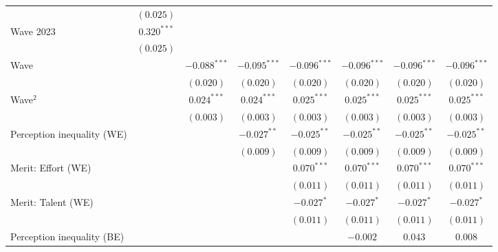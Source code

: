 \documentclass[
  12pt,
]{article}
\begin{document}
\begin{table}
{\begin{center}
{\begin{tabular}{l c c c c c c c}
                                   & $(0.025)$      &                &                &                &                &                &                \\
\quad Wave 2023                    & $0.320^{***}$  &                &                &                &                &                &                \\
                                   & $(0.025)$      &                &                &                &                &                &                \\
Wave                               &                & $-0.088^{***}$ & $-0.095^{***}$ & $-0.096^{***}$ & $-0.096^{***}$ & $-0.096^{***}$ & $-0.096^{***}$ \\
                                   &                & $(0.020)$      & $(0.020)$      & $(0.020)$      & $(0.020)$      & $(0.020)$      & $(0.020)$      \\
Wave$^2$                           &                & $0.024^{***}$  & $0.024^{***}$  & $0.025^{***}$  & $0.025^{***}$  & $0.025^{***}$  & $0.025^{***}$  \\
                                   &                & $(0.003)$      & $(0.003)$      & $(0.003)$      & $(0.003)$      & $(0.003)$      & $(0.003)$      \\
Perception inequality (WE)         &                &                & $-0.027^{**}$  & $-0.025^{**}$  & $-0.025^{**}$  & $-0.025^{**}$  & $-0.025^{**}$  \\
                                   &                &                & $(0.009)$      & $(0.009)$      & $(0.009)$      & $(0.009)$      & $(0.009)$      \\
Merit: Effort (WE)                 &                &                &                & $0.070^{***}$  & $0.070^{***}$  & $0.070^{***}$  & $0.070^{***}$  \\
                                   &                &                &                & $(0.011)$      & $(0.011)$      & $(0.011)$      & $(0.011)$      \\
Merit: Talent (WE)                 &                &                &                & $-0.027^{*}$   & $-0.027^{*}$   & $-0.027^{*}$   & $-0.027^{*}$   \\
                                   &                &                &                & $(0.011)$      & $(0.011)$      & $(0.011)$      & $(0.011)$      \\
Perception inequality (BE)         &                &                &                &                & $-0.002$       & $0.043$        & $0.008$        \\

\end{tabular}}
\end{center}}
\end{table}
\end{document}
